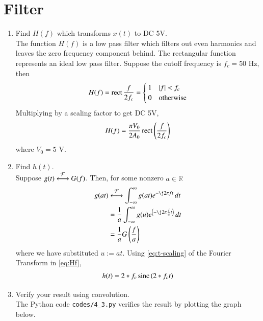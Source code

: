 \documentclass[journal,12pt,twocolumn]{IEEEtran}
\renewcommand\thesection{\arabic{section}}
\begin{document}
\section{Filter}
\begin{enumerate}[label=\thesection.\arabic*
,ref=\thesection.\theenumi]
\item Find $H(f)$ which transforms $x(t)$ to DC 5V.\\
\solution The function $H(f)$ is a low pass filter which filters out
even harmonics and leaves the zero frequency component behind.
The rectangular function represents an ideal low pass filter. 
Suppose the cutoff frequency is $f_c = 50$ Hz, then
\begin{align}
    H(f) = \mathop{\mathrm{rect}}{\frac{f}{2f_c}} =
    \begin{cases}
        1 & \left\vert f\right\vert < f_c \\
        0 & \textrm{otherwise}
    \end{cases}
    \label{eq:Hf}
\end{align}
Multiplying by a scaling factor to get DC 5V,
\begin{align}
    H(f) = \frac{\pi V_0}{2A_0}\mathop{\mathrm{rect}}{\left(\frac{f}{2f_c}\right)}
\end{align}
where $V_0 = 5$ V.
\item Find $h(t)$.\\
\solution Suppose $g(t)\overset{\mathcal{F}}{ \longleftrightarrow}G(f)$. Then, for some
nonzero $a \in \mathbb{R}$
\begin{align}
    g(at)&\system{F}\int_{-\infty}^{\infty}g(at)e^{-\j2\pi ft}\, dt \\
         &=\frac{1}{a}\int_{-\infty}^{\infty}g(u)e^{\brak{-\j2\pi \frac{f}{a}t}}\, dt \\
         &=\frac{1}{a}G\brak{\frac{f}{a}}
         \label{eq:t-scaling}
\end{align}
where we have substituted $u := at$. Using 
\eqref{eq:t-scaling} of the Fourier Transform in \eqref{eq:Hf},
\begin{align}
    h(t) = 2*f_c \mathop{\mathrm{sinc}} \left(2*f_c t\right)
\end{align}
\item Verify your result using convolution.\\
\solution The Python code \texttt{codes/4\_3.py} verifies the result
by plotting the graph below.
\begin{figure}[!ht]

\end{figure}
\end{enumerate}
\end{document}
